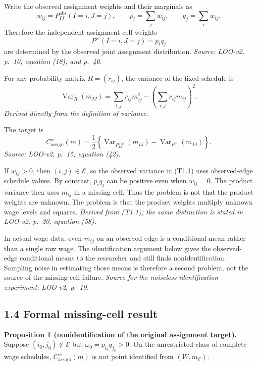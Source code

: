 \documentclass[11pt]{article}
\begin{document}
Write the observed assignment weights and their marginals as
\[
w_{ij}=P^{\mathrm{obs}}_{IJ}(I=i,J=j),\qquad
p_i=\sum_jw_{ij},\qquad q_j=\sum_iw_{ij}.
\]
Therefore the independent-assignment cell weights
\[
P^\times(I=i,J=j)=p_iq_j
\]
are determined by the observed joint assignment distribution.
\textit{Source: LOO-v2, p.\ 10, equation (18), and p.\ 40.}

For any probability matrix \(R=(r_{ij})\), the variance of the fixed schedule is
\[
\operatorname{Var}_{R}(m_{IJ})
=\sum_{i,j}r_{ij}m_{ij}^{2}
-\left(\sum_{i,j}r_{ij}m_{ij}\right)^2.
\]
\textit{Derived directly from the definition of variance.}

The target is
\[
C^w_{\mathrm{assign}}(m)
=\frac12\left\{
\operatorname{Var}_{P^{\mathrm{obs}}_{IJ}}(m_{IJ})
-\operatorname{Var}_{P^\times}(m_{IJ})
\right\}.
\tag{T1.1}
\]
\textit{Source: LOO-v2, p.\ 15, equation (42).}

If \(w_{ij}>0\), then \((i,j)\in\mathcal E\), so the observed variance in
(T1.1) uses observed-edge schedule values.  By contrast, \(p_iq_j\) can be
positive even when \(w_{ij}=0\).  The product variance then uses \(m_{ij}\) in
a missing cell.  Thus the problem is not that the product weights are unknown.
The problem is that the product weights multiply unknown wage levels and
squares.  \textit{Derived from (T1.1); the same distinction is stated in
LOO-v2, p.\ 20, equation (58).}

In actual wage data, even \(m_{ij}\) on an observed edge is a conditional mean
rather than a single raw wage.  The identification argument below gives the
observed-edge conditional means to the researcher and still finds
nonidentification.  Sampling noise in estimating those means is therefore a
second problem, not the source of the missing-cell failure.
\textit{Source for the noiseless identification experiment: LOO-v2, p.\ 19.}

\subsection{1.4 Formal missing-cell result}

\textbf{Proposition 1 (nonidentification of the original assignment target).}
Suppose \((i_0,j_0)\notin\mathcal E\) but
\(\omega_0=p_{i_0}q_{j_0}>0\).  On the unrestricted class of complete wage
schedules, \(C^w_{\mathrm{assign}}(m)\) is not point identified from
\((W,m_{\mathcal E})\).
\end{document}
